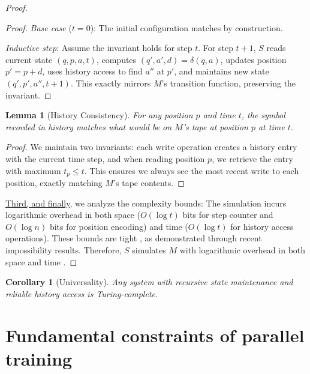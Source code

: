 \documentclass[12pt]{article}
\newtheorem{lemma}[theorem]{Lemma}
\newtheorem{corollary}[theorem]{Corollary}
\begin{document}
\begin{proof}
\begin{proof}
\vspace{0.3em}
\noindent\textit{Base case} ($t=0$): The initial configuration matches by construction.

\vspace{0.3em}
\noindent\textit{Inductive step}: Assume the invariant holds for step $t$. 
For step $t+1$, $S$ reads current state $(q, p, a, t)$, computes $(q', a', d) = \delta(q, a)$, updates position $p' = p + d$, uses history access to find $a''$ at $p'$, and maintains new state $(q', p', a'', t+1)$.
This exactly mirrors $M$'s transition function, preserving the invariant.
\end{proof}

\begin{lemma}[History Consistency]
For any position $p$ and time $t$, the symbol recorded in history matches what would be on $M$'s tape at position $p$ at time $t$.
\end{lemma}

\begin{proof}
We maintain two invariants: each write operation creates a history entry with the current time step, and when reading position $p$, we retrieve the entry with maximum $t_p \leq t$.
This ensures we always see the most recent write to each position, exactly matching $M$'s tape contents.
\end{proof}

\vspace{0.5em}
\noindent\underline{Third, and finally}, we analyze the complexity bounds: The simulation incurs logarithmic overhead in both space ($O(\log t)$ bits for step counter and $O(\log n)$ bits for position encoding) and time ($O(\log t)$ for history access operations). These bounds are tight \cite{parzych2024memory,hhan2024new,boyle2024memory}, as demonstrated through recent impossibility results. Therefore, $S$ simulates $M$ with logarithmic overhead in both space and time \cite{savage1994space,vonkorff2019molecular,bennett1989time}.
\end{proof}

\begin{corollary}[Universality]
Any system with recursive state maintenance and reliable history access is Turing-complete.
\end{corollary}

\section{Fundamental constraints of parallel training}
\end{document}

